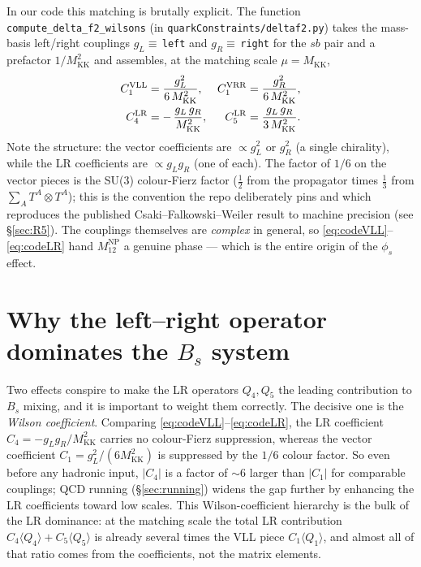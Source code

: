 \documentclass[11pt]{article}
\newcommand{\MKK}{M_{\mathrm{KK}}}
\newcommand{\half}{\tfrac{1}{2}}
\newcommand{\code}[1]{\texttt{#1}}
\newcommand{\Bs}{B_s}
\newcommand{\phis}{\phi_s}
\newcommand{\MtwelveNP}{M_{12}^{\mathrm{NP}}}
\theoremstyle{definition}
\begin{document}
In our code this matching is brutally explicit. The function
\code{compute\_delta\_f2\_wilsons} (in \code{quarkConstraints/deltaf2.py}) takes
the mass-basis left/right couplings $g_L\equiv$\,\code{left} and
$g_R\equiv$\,\code{right} for the $sb$ pair and a prefactor
$1/\MKK^2$ and assembles, at the matching scale $\mu=\MKK$,
\begin{align}
C_1^{\rm VLL} &= \frac{g_L^2}{6\,\MKK^2}, &
C_1^{\rm VRR} &= \frac{g_R^2}{6\,\MKK^2},
\label{eq:codeVLL}\\
C_4^{\rm LR} &= -\,\frac{g_L\,g_R}{\MKK^2}, &
C_5^{\rm LR} &= \frac{g_L\,g_R}{3\,\MKK^2}.
\label{eq:codeLR}
\end{align}
Note the structure: the vector coefficients are $\propto g_L^2$ or $g_R^2$ (a
single chirality), while the LR coefficients are $\propto g_L g_R$ (one of each).
The factor of $1/6$ on the vector pieces is the SU(3) colour-Fierz factor
($\half$ from the propagator times $\tfrac13$ from $\sum_A T^A\!\otimes T^A$);
this is the convention the repo deliberately pins and which reproduces the
published Csaki--Falkowski--Weiler result to machine precision (see
\S\ref{sec:R5}). The couplings themselves are \emph{complex} in general, so
\eqref{eq:codeVLL}--\eqref{eq:codeLR} hand $\MtwelveNP$ a genuine phase --- which
is the entire origin of the $\phis$ effect.

\section{Why the left--right operator dominates the $\Bs$ system}
\label{sec:lr}

Two effects conspire to make the LR operators $Q_4,Q_5$ the leading contribution
to $\Bs$ mixing, and it is important to weight them correctly. The decisive one
is the \emph{Wilson coefficient}. Comparing \eqref{eq:codeVLL}--\eqref{eq:codeLR},
the LR coefficient $C_4 = -g_L g_R/\MKK^2$ carries no colour-Fierz suppression,
whereas the vector coefficient $C_1 = g_L^2/(6\MKK^2)$ is suppressed by the
$1/6$ colour factor. So even before any hadronic input, $|C_4|$ is a factor of
$\sim 6$ larger than $|C_1|$ for comparable couplings; QCD running
(\S\ref{sec:running}) widens the gap further by enhancing the LR coefficients
toward low scales. This Wilson-coefficient hierarchy is the bulk of the LR
dominance: at the matching scale the total LR contribution
$C_4\langle Q_4\rangle + C_5\langle Q_5\rangle$ is already several times the VLL
piece $C_1\langle Q_1\rangle$, and almost all of that ratio comes from the
coefficients, not the matrix elements.
\end{document}
